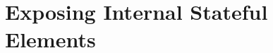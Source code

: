 \documentclass{article}
\begin{document}




\newpage
\section{Exposing Internal Stateful Elements}
\end{document}
